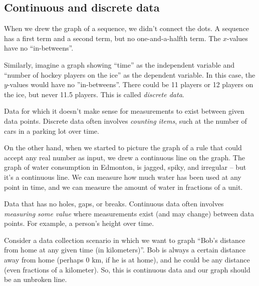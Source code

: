 \subsection{Continuous and discrete data}

When we drew the graph of a sequence, we didn't connect the dots. A sequence has a first term and a second term, but no one-and-a-halfth term. The $x$-values have no ``in-betweens''.

Similarly, imagine a graph showing ``time'' as the independent variable and ``number of hockey players on the ice'' as the dependent variable. In this case, the $y$-values would have no ''in-betweens''. There could be 11 players or 12 players on the ice, but never 11.5 players. This is called \textit{discrete data}.

\begin{boxeddef}
Data for which it doesn't make sense for measurements to exist between given data points. Discrete data often involves \textit{counting items}, such at the number of cars in a parking lot over time. 
\end{boxeddef}

On the other hand, when we started to picture the graph of a rule that could accept any real number as input, we drew a continuous line on the graph. The graph of water consumption in Edmonton, is jagged, spiky, and irregular -- but it's a continuous line. We can measure how much water has been used at any point in time, and we can measure the amount of water in fractions of a unit.

\begin{boxeddef}
Data that has no holes, gaps, or breaks. Continuous data often involves \textit{measuring some value} where measurements exist (and may change) between data points. For example, a person's height over time.
\end{boxeddef}


Consider a data collection scenario in which we want to graph ``Bob's distance from home at any given time (in kilometers)''. Bob is always a certain distance away from home (perhaps 0 km, if he is at home), and he could be any distance (even fractions of a kilometer). So, this is continuous data and our graph should be an unbroken line.

